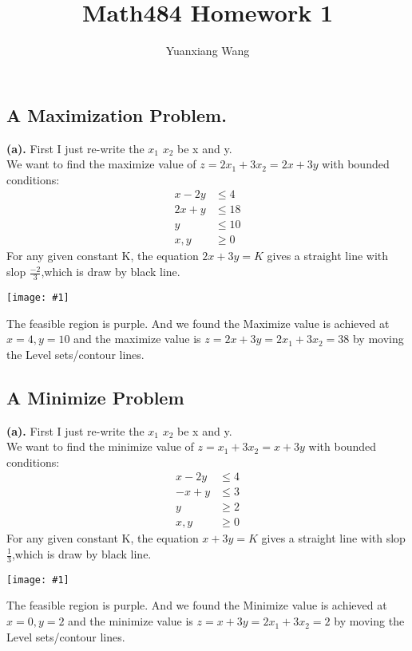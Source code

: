 \documentclass[11pt]{article}
\title{Math484 Homework 1}
\author{Yuanxiang Wang}
\newcommand{\simplot}[1]{\begin{center}
  \texttt{[image: \#1]}
\end{center}}
\begin{document}
\maketitle
\tableofcontents

\section*{}
\setcounter{section}{1}
\subsection{A Maximization Problem.} 
\textbf{(a).}
First I just re-write the $x_1$ $x_2$ be x and y.\\
We want to find the maximize value of $z=2x_1+3x_2=2x+3y$ with bounded conditions:\\
\begin{align*}
    x-2y&\leq 4\\
    2x+y&\leq 18\\
    y&\leq 10\\
    x,y&\geq 0
\end{align*}
For any given constant K, the equation $2x+3y=K$ gives a straight line with slop $\frac{-2}{3}$,which is draw by black line.
\simplot{484-hw1.1.1.jpg}
The feasible region is purple. And we found the Maximize value is achieved at $x=4,y=10$ and the maximize value 
is $z=2x+3y=2x_1+3x_2=38$ by moving the Level sets/contour lines.
\newpage
\subsection{A Minimize Problem}
\textbf{(a).}
First I just re-write the $x_1$ $x_2$ be x and y.\\
We want to find the minimize value of $z=x_1+3x_2=x+3y$ with bounded conditions:\\
\begin{align}
    x-2y&\leq 4\\
    -x+y&\leq 3\\
    y&\geq 2\\
    x,y&\geq 0
\end{align}
For any given constant K, the equation $x+3y=K$ gives a straight line with slop $\frac{1}{3}$,which is draw by black line.
\simplot{484-hw1.2.1.jpg}
The feasible region is purple. And we found the Minimize value is achieved at $x=0,y=2$ and the minimize value
is $z=x+3y=2x_1+3x_2=2$ by moving the Level sets/contour lines.
\newpage
\end{document}

